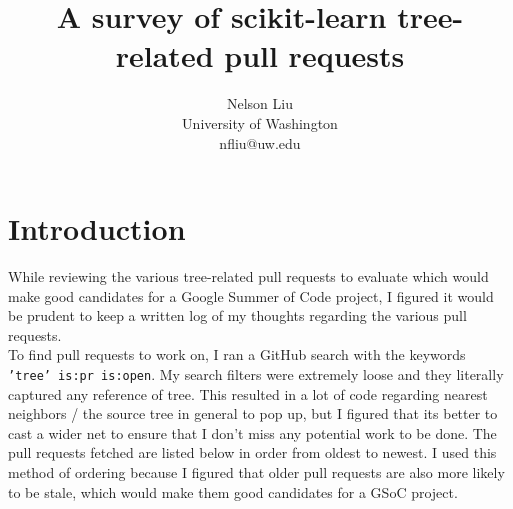 \documentclass[12pt, oneside]{article}
\title{A survey of scikit-learn tree-related pull requests}
\author{Nelson Liu \\
  University of Washington \\
  nfliu@uw.edu }
\begin{document}
\maketitle
\section{Introduction}
While reviewing the various tree-related pull requests to evaluate
which would make good candidates for a Google Summer of Code project,
I figured it would be prudent to keep a written log of my thoughts
regarding the various pull requests.\\
To find pull requests to work on, I ran a GitHub search with the
keywords \texttt{'tree' is:pr is:open}. My search filters were
extremely loose and they literally captured any reference of
tree. This resulted in a lot of code regarding nearest neighbors / the
source tree in general to pop up, but I figured that its better to
cast a wider net to ensure that I don't miss any potential work to be
done. The pull requests fetched are listed below in order from oldest
to newest. I used this method of ordering because I figured that older
pull requests are also more likely to be stale, which would make them
good candidates for a GSoC project.
\end{document}
